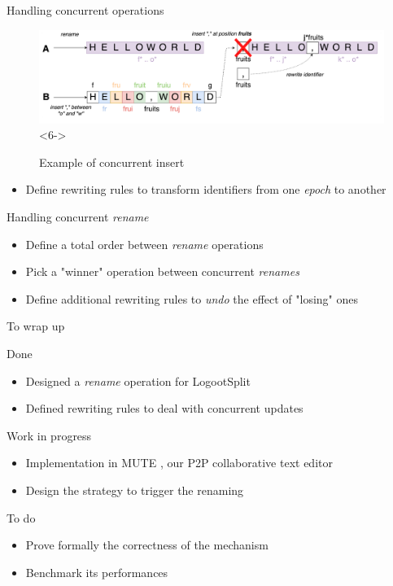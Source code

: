 \documentclass[10pt]{beamer}
\begin{document}
\begin{frame}{Handling concurrent operations}
\begin{figure}
    \includegraphics[scale=0.09]{img/concurrent-insert-rename-6.png}<6->
    \caption{Example of concurrent insert}
  \end{figure}
  \begin{itemize}
    \item<5-> Define rewriting rules to transform identifiers from one \emph{epoch} to another
  \end{itemize}
\end{frame}

\begin{frame}{Handling concurrent \emph{rename}}
  \begin{itemize}
    \item Define a total order between \emph{rename} operations
    \item Pick a "winner" operation between concurrent \emph{renames}
    \item Define additional rewriting rules to \emph{undo} the effect of "losing" ones
  \end{itemize}
\end{frame}

\begin{frame}{To wrap up}

  \begin{block}{Done}
    \begin{itemize}
      \item Designed a \emph{rename} operation for LogootSplit
      \item Defined rewriting rules to deal with concurrent updates
    \end{itemize}
  \end{block}

  \begin{block}{Work in progress}
    \begin{itemize}
      \item Implementation in MUTE \cite{nicolas:hal-01655438}, our P2P collaborative text editor
      \item Design the strategy to trigger the renaming
    \end{itemize}
  \end{block}

  \begin{block}{To do}
    \begin{itemize}
      \item Prove formally the correctness of the mechanism
      \item Benchmark its performances
    \end{itemize}
  \end{block}
\end{frame}
\end{document}
